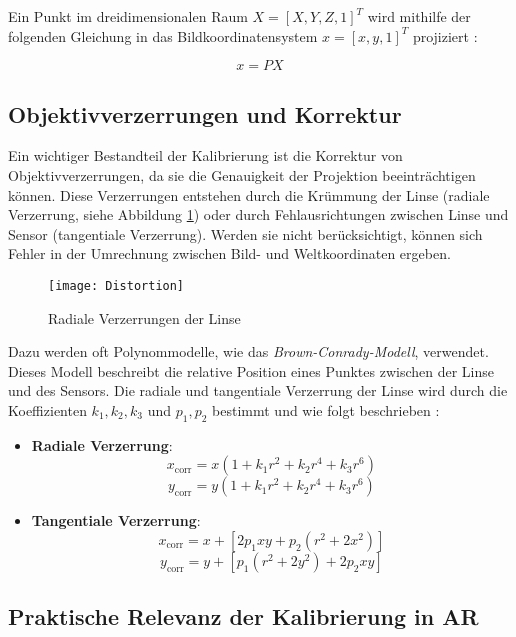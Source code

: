 Ein Punkt im dreidimensionalen Raum \( X = [X, Y, Z, 1]^T \) wird mithilfe der folgenden Gleichung in das Bildkoordinatensystem \( x = [x, y, 1]^T \) projiziert \cite{mw2024calibration}:

\[
x = PX
\]

\subsection{Objektivverzerrungen und Korrektur}

Ein wichtiger Bestandteil der Kalibrierung ist die Korrektur von Objektivverzerrungen, da sie die Genauigkeit der Projektion beeinträchtigen können. Diese Verzerrungen entstehen durch die Krümmung der Linse (radiale Verzerrung, siehe Abbildung \ref{fig:Distortion}) oder durch Fehlausrichtungen zwischen Linse und Sensor (tangentiale Verzerrung). Werden sie nicht berücksichtigt, können sich Fehler in der Umrechnung zwischen Bild- und Weltkoordinaten ergeben. \cite{mw2024calibration, szeliski2022computerVision}

\begin{figure}[h]
    \centering
    \texttt{[image: Distortion]}
    \caption{Radiale Verzerrungen der Linse \cite{stachniss2021calibration}\label{fig:Distortion}}
\end{figure}

Dazu werden oft Polynommodelle, wie das \emph{Brown-Conrady-Modell}, verwendet. Dieses Modell beschreibt die relative Position eines Punktes zwischen der Linse und des Sensors. Die radiale und tangentiale Verzerrung der Linse wird durch die Koeffizienten \( k_1, k_2, k_3 \) und \( p_1, p_2 \) bestimmt \cite{brown1966distortion} und wie folgt beschrieben \cite{mw2024calibration, szeliski2022computerVision}:
\begin{itemize}
    \item \textbf{Radiale Verzerrung}:
    \[ x_{\text{corr}} = x \left( 1 + k_1 r^2 + k_2 r^4 + k_3 r^6 \right) \]
    \[ y_{\text{corr}} = y \left( 1 + k_1 r^2 + k_2 r^4 + k_3 r^6 \right) \]
    \item \textbf{Tangentiale Verzerrung}:
    \[ x_{\text{corr}} = x + [2p_1xy + p_2(r^2 + 2x^2)] \]
    \[ y_{\text{corr}} = y + [p_1(r^2 + 2y^2) + 2p_2xy] \]
\end{itemize}

\subsection{Praktische Relevanz der Kalibrierung in AR}

